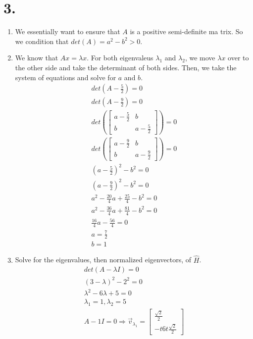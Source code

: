 \documentclass[11pt]{article}
\newenvironment{qparts}{\begin{enumerate}[{(}a{)}]}{\end{enumerate}}
\begin{document}
\section*{3.}
\begin{qparts}
\item
We essentially want to ensure that $A$ is a positive semi-definite ma trix. So we condition that $det(A) = a^2 - b^2 > 0$.
\item
We know that $Ax = \lambda x$. For both eigenvaleus $\lambda_1$ and $\lambda_2$, we move $\lambda x$ over to the other side and take the determinant of both sides. Then, we take the system of equations and solve for $a$ and $b$.
\begin{align*}
    det(A - \frac{5}{2}) = 0\\
    det(A - \frac{9}{2}) = 0\\
    det\left(\begin{bmatrix}
        a-\frac{5}{2} & b \\
        b & a-\frac{5}{2}
    \end{bmatrix}\right) = 0\\
    det\left(\begin{bmatrix}
        a-\frac{9}{2} & b \\
        b & a-\frac{9}{2}
    \end{bmatrix}\right) = 0\\
    \left(a-\frac{5}{2}\right)^2 - b^2 = 0\\
    \left(a-\frac{9}{2}\right)^2 - b^2 = 0\\
    a^2 - \frac{20}{4}a+\frac{25}{4} - b^2 = 0\\
    a^2 - \frac{36}{4}a+\frac{81}{4} - b^2 = 0\\
    \frac{16}{4}a-\frac{56}{4} = 0\\
    a = \frac{7}{2}\\
    b=1
\end{align*}
\item
Solve for the eigenvalues, then normalized eigenvectors, of $\widehat{H}$. 
\begin{align*}
    det(A - \lambda I) = 0\\
    (3-\lambda)^2 - 2^2 = 0\\
    \lambda^2-6\lambda + 5 = 0\\
    \lambda_1 = 1, \lambda_2 = 5\\
    A-1I = 0 \Longrightarrow \vec{v}_{\lambda_1} = \begin{bmatrix}\frac{\sqrt{2}}{2}\\-t6t\frac{\sqrt{2}}{2}\end{bmatrix}\\

\end{align*}
\end{qparts}
\end{document}
